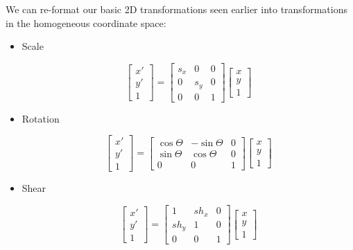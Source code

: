 \documentclass{article}
\begin{document}
We can re-format our basic 2D transformations seen earlier into transformations in the homogeneous coordinate space:

\begin{itemize}
  \item Scale

        \[
        \begin{bmatrix}
    x' \\ y' \\ 1
  \end{bmatrix} =
  \begin{bmatrix}
    s_{x} & 0 & 0 \\
    0 & s_{y} & 0 \\
    0 & 0 & 1
  \end{bmatrix}
  \begin{bmatrix}
    x \\ y \\ 1
  \end{bmatrix}
        \]
  \item Rotation

        \[
        \begin{bmatrix}
    x' \\ y' \\ 1
  \end{bmatrix} =
        \begin{bmatrix}
          \cos\Theta & -\sin\Theta & 0 \\
          \sin\Theta & \cos\Theta & 0 \\
          0 & 0 & 1
  \end{bmatrix}
  \begin{bmatrix}
    x \\ y \\ 1
  \end{bmatrix}
        \]
  \item Shear

        \[
        \begin{bmatrix}
    x' \\ y' \\ 1
  \end{bmatrix} =
        \begin{bmatrix}
          1 & sh_{x} & 0 \\
          sh_{y} & 1 & 0 \\
          0 & 0 & 1
  \end{bmatrix}
  \begin{bmatrix}
    x \\ y \\ 1
  \end{bmatrix}
        \]

\end{itemize}
\end{document}
